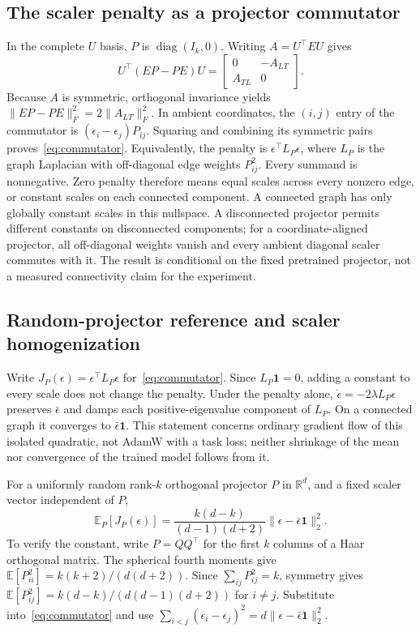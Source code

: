 \documentclass{article}
\newcommand{\diag}{\operatorname{diag}}
\begin{document}
\subsection{The scaler penalty as a projector commutator}
\label{app:commutator}
In the complete $U$ basis, $P$ is $\diag(I_k,0)$. Writing $A=U^\top EU$ gives
\begin{equation}
U^\top(EP-PE)U=
\begin{bmatrix}0&-A_{LT}\\A_{TL}&0\end{bmatrix}.
\end{equation}
Because $A$ is symmetric, orthogonal invariance yields $\|EP-PE\|_F^2=2\|A_{LT}\|_F^2$. In ambient coordinates, the $(i,j)$ entry of the commutator is $(\epsilon_i-\epsilon_j)P_{ij}$. Squaring and combining its symmetric pairs proves~\eqref{eq:commutator}. Equivalently, the penalty is $\epsilon^\top L_P\epsilon$, where $L_P$ is the graph Laplacian with off-diagonal edge weights $P_{ij}^2$. Every summand is nonnegative. Zero penalty therefore means equal scales across every nonzero edge, or constant scales on each connected component. A connected graph has only globally constant scales in this nullspace. A disconnected projector permits different constants on disconnected components; for a coordinate-aligned projector, all off-diagonal weights vanish and every ambient diagonal scaler commutes with it. The result is conditional on the fixed pretrained projector, not a measured connectivity claim for the experiment.

\subsection{Random-projector reference and scaler homogenization}
\label{app:randompenalty}
Write $J_P(\epsilon)=\epsilon^\top L_P\epsilon$ for~\eqref{eq:commutator}. Since $L_P\mathbf1=0$, adding a constant to every scale does not change the penalty. Under the penalty alone, $\dot\epsilon=-2\lambda L_P\epsilon$ preserves $\bar\epsilon$ and damps each positive-eigenvalue component of $L_P$. On a connected graph it converges to $\bar\epsilon\mathbf1$. This statement concerns ordinary gradient flow of this isolated quadratic, not AdamW with a task loss; neither shrinkage of the mean nor convergence of the trained model follows from it.

For a uniformly random rank-$k$ orthogonal projector $P$ in $\mathbb R^d$, and a fixed scaler vector independent of $P$,
\begin{equation}
\mathbb E_P[J_P(\epsilon)]
=\frac{k(d-k)}{(d-1)(d+2)}\|\epsilon-\bar\epsilon\mathbf1\|_2^2.
\label{eq:randompenalty}
\end{equation}
To verify the constant, write $P=QQ^\top$ for the first $k$ columns of a Haar orthogonal matrix. The spherical fourth moments give $\mathbb E[P_{ii}^2]=k(k+2)/(d(d+2))$. Since $\sum_{ij}P_{ij}^2=k$, symmetry gives $\mathbb E[P_{ij}^2]=k(d-k)/(d(d-1)(d+2))$ for $i\ne j$. Substitute into~\eqref{eq:commutator} and use $\sum_{i<j}(\epsilon_i-\epsilon_j)^2=d\|\epsilon-\bar\epsilon\mathbf1\|_2^2$.
\end{document}
